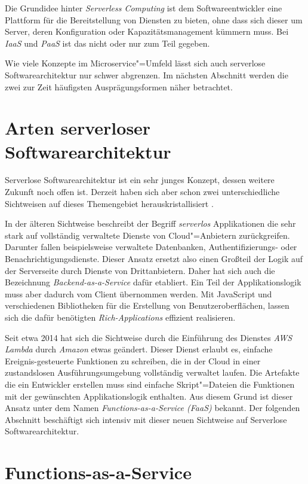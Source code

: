 Die Grundidee hinter \textit{Serverless Computing} ist dem Softwareentwickler eine Plattform für die Bereitstellung von Diensten zu bieten, ohne dass sich dieser um Server, deren Konfiguration oder Kapazitätsmanagement kümmern muss. Bei \textit{IaaS} und \textit{PaaS} ist das nicht oder nur zum Teil gegeben.

Wie viele Konzepte im Microservice"=Umfeld lässt sich auch serverlose Softwarearchitektur nur schwer abgrenzen. Im nächsten Abschnitt werden die zwei zur Zeit häufigsten Ausprägungsformen näher betrachtet.

\section{Arten serverloser Softwarearchitektur}

Serverlose Softwarearchitektur ist ein sehr junges Konzept, dessen weitere Zukunft noch offen ist. Derzeit haben sich aber schon zwei unterschiedliche Sichtweisen auf dieses Themengebiet herauskristallisiert \cite{ServerlessArchitectures}.

In der älteren Sichtweise beschreibt der Begriff \textit{serverlos} Applikationen die sehr stark auf vollständig verwaltete Dienste von Cloud"=Anbietern zurückgreifen. Darunter fallen beispielsweise verwaltete Datenbanken, Authentifizierungs- oder Benachrichtigungsdienste. Dieser Ansatz ersetzt also einen Großteil der Logik auf der Serverseite durch Dienste von Drittanbietern. Daher hat sich auch die Bezeichnung \textit{Backend-as-a-Service} dafür etabliert. Ein Teil der Applikationslogik muss aber dadurch vom Client übernommen werden. Mit JavaScript und verschiedenen Bibliotheken für die Erstellung von Benutzeroberflächen, lassen sich die dafür benötigten \textit{Rich-Applications} effizient realisieren.

Seit etwa 2014 hat sich die Sichtweise durch die Einführung des Dienstes \textit{AWS Lambda} durch \textit{Amazon} etwas geändert. Dieser Dienst erlaubt es, einfache Ereignis-gesteuerte Funktionen zu schreiben, die in der Cloud in einer zustandslosen Ausführungsumgebung vollständig verwaltet laufen. Die Artefakte die ein Entwickler erstellen muss sind einfache Skript"=Dateien die Funktionen mit der gewünschten Applikationslogik enthalten. Aus diesem Grund ist dieser Ansatz unter dem Namen \textit{Functions-as-a-Service (FaaS)} bekannt. Der folgenden Abschnitt beschäftigt sich intensiv mit dieser neuen Sichtweise auf Serverlose Softwarearchitektur.

\section{Functions-as-a-Service}

